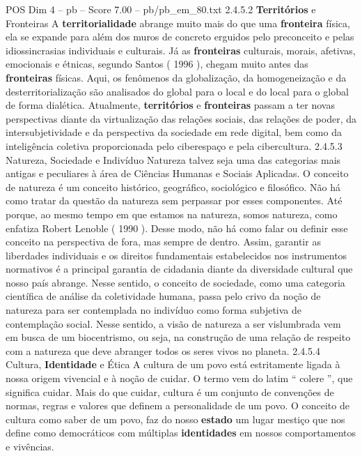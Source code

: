 \begin{textsample}{POS Dim 4 – pb – Score 7.00 – pb/pb\_em\_80.txt}  \label{ex:f4_pos_268}
2.4.5.2 \textbf{Territórios} e Fronteiras A \textbf{territorialidade} abrange muito mais do que uma \textbf{fronteira} física, ela se expande para além dos muros de concreto erguidos pelo preconceito e pelas idiossincrasias individuais e culturais.
Já as \textbf{fronteiras} culturais, morais, afetivas, emocionais e étnicas, segundo Santos ( 1996 ), chegam muito antes das \textbf{fronteiras} físicas.
Aqui, os fenômenos da globalização, da homogeneização e da desterritorialização são analisados do global para o local e do local para o global de forma dialética.
Atualmente, \textbf{territórios} e \textbf{fronteiras} passam a ter novas perspectivas diante da virtualização das relações sociais, das relações de poder, da intersubjetividade e da perspectiva da sociedade em rede digital, bem como da inteligência coletiva proporcionada pelo ciberespaço e pela cibercultura. 2.4.5.3 Natureza, Sociedade e Indivíduo Natureza talvez seja uma das categorias mais antigas e peculiares à área de Ciências Humanas e Sociais Aplicadas.
O conceito de natureza é um conceito histórico, geográfico, sociológico e filosófico.
Não há como tratar da questão da natureza sem perpassar por esses componentes.
Até porque, ao mesmo tempo em que estamos na natureza, somos natureza, como enfatiza Robert Lenoble ( 1990 ).
Desse modo, não há como falar ou definir esse conceito na perspectiva de fora, mas sempre de dentro.
Assim, garantir as liberdades individuais e os direitos fundamentais estabelecidos nos instrumentos normativos é a principal garantia de cidadania diante da diversidade cultural que nosso país abrange.
Nesse sentido, o conceito de sociedade, como uma categoria científica de análise da coletividade humana, passa pelo crivo da noção de natureza para ser contemplada no indivíduo como forma subjetiva de contemplação social.
Nesse sentido, a visão de natureza a ser vislumbrada vem em busca de um biocentrismo, ou seja, na construção de uma relação de respeito com a natureza que deve abranger todos os seres vivos no planeta. 2.4.5.4 Cultura, \textbf{Identidade} e Ética A cultura de um povo está estritamente ligada à nossa origem vivencial e à noção de cuidar.
O termo vem do latim “ colere ”, que significa cuidar.
Mais do que cuidar, cultura é um conjunto de convenções de normas, regras e valores que definem a personalidade de um povo.
O conceito de cultura como saber de um povo, faz do nosso \textbf{estado} um lugar mestiço que nos define como democráticos com múltiplas \textbf{identidades} em nossos comportamentos e vivências.

\end{textsample}
